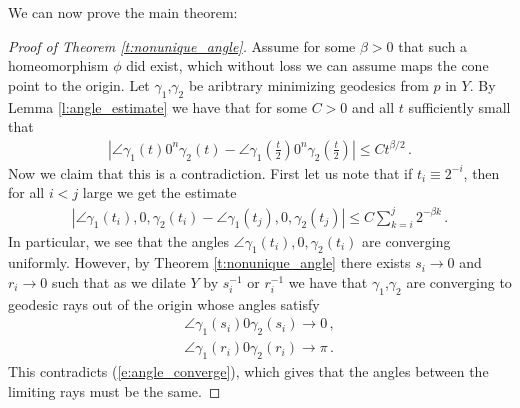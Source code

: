 \documentclass[11pt]{article}
\begin{document}
We can now prove the main theorem:

\begin{proof}
[Proof of Theorem \ref{t:nonunique_angle}]
Assume for some $\beta>0$ that such a homeomorphism $\phi$ did exist, which without loss we can assume maps the cone point to the origin.  Let $\gamma_1$,$\gamma_2$ be aribtrary minimizing geodesics from $p$ in $Y$.  By Lemma \ref{l:angle_estimate} we have that for some $C>0$ and all $t$ sufficiently small that
\begin{align}\label{e:angle_converge}
 |\angle\gamma_1(t)0^n\gamma_2(t)-\angle\gamma_1(\frac{t}{2})0^n\gamma_2(\frac{t}{2})|\leq Ct^{\beta/2}\, .
\end{align}
Now we claim that this is a contradiction.  First let us note that if $t_i\equiv 2^{-i}$, then for all $i<j$ large we get the estimate
\begin{align}
 |\angle\gamma_1(t_i),0,\gamma_2(t_i)-\angle\gamma_1(t_j),0,\gamma_2(t_j)|\leq C\sum_{k=i}^j 2^{-\beta k}\, .
\end{align}
In particular, we see that the angles $\angle\gamma_1(t_i),0,\gamma_2(t_i)$ are converging uniformly.  However, by Theorem \ref{t:nonunique_angle} there exists $s_i\to 0$ and $r_i\to 0$ such that as we dilate $Y$ by $s^{-1}_i$ or $r_i^{-1}$ we have that $\gamma_1$,$\gamma_2$ are converging to geodesic rays out of the origin whose angles satisfy
\begin{align}
 \angle\gamma_1(s_i)0\gamma_2(s_i)\to 0\, ,\\
 \angle\gamma_1(r_i)0\gamma_2(r_i)\to \pi\, .
\end{align}
This contradicts (\ref{e:angle_converge}), which gives that the angles between the limiting rays must be the same.
\end{proof}
\end{document}
